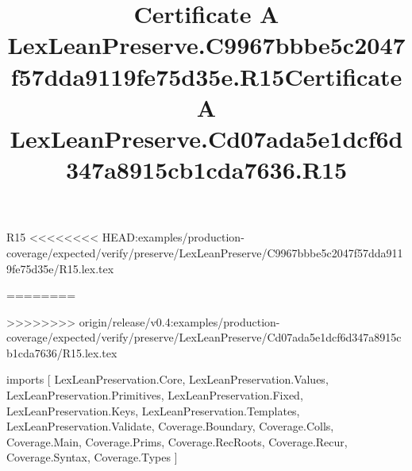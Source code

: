 \begin{lexlean}{R15}
<<<<<<<< HEAD:examples/production-coverage/expected/verify/preserve/LexLeanPreserve/C9967bbbe5c2047f57dda9119fe75d35e/R15.lex.tex
\title{Certificate A LexLeanPreserve.C9967bbbe5c2047f57dda9119fe75d35e.R15}
========
\title{Certificate A LexLeanPreserve.Cd07ada5e1dcf6d347a8915cb1cda7636.R15}
>>>>>>>> origin/release/v0.4:examples/production-coverage/expected/verify/preserve/LexLeanPreserve/Cd07ada5e1dcf6d347a8915cb1cda7636/R15.lex.tex
\begin{coremodule}
imports [
  LexLeanPreservation.Core,
  LexLeanPreservation.Values,
  LexLeanPreservation.Primitives,
  LexLeanPreservation.Fixed,
  LexLeanPreservation.Keys,
  LexLeanPreservation.Templates,
  LexLeanPreservation.Validate,
  Coverage.Boundary,
  Coverage.Colls,
  Coverage.Main,
  Coverage.Prims,
  Coverage.RecRoots,
  Coverage.Recur,
  Coverage.Syntax,
  Coverage.Types
]


\end{coremodule}
\end{lexlean}
